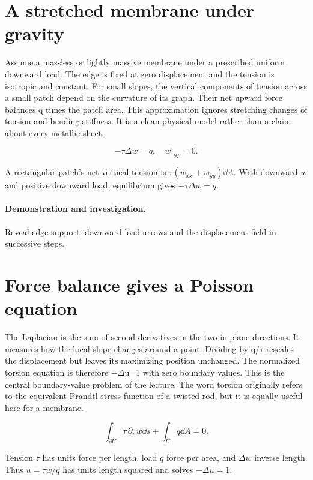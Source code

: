 \documentclass[11pt,oneside,openany]{book}
\begin{document}
\section{A stretched membrane under gravity}\label{sec:slide32}

Assume a massless or lightly massive membrane under a prescribed uniform downward load. The edge is fixed at zero displacement and the tension is isotropic and constant. For small slopes, the vertical components of tension across a small patch depend on the curvature of its graph. Their net upward force balances q times the patch area. This approximation ignores stretching changes of tension and bending stiffness. It is a clean physical model rather than a claim about every metallic sheet.


\[-\tau\Delta w=q,\quad w|_{\partial T}=0.\]


A rectangular patch's net vertical tension is
$\tau(w_{xx}+w_{yy})\dd A$. With downward $w$ and positive downward
load, equilibrium gives $-\tau\Delta w=q$.



\paragraph{Demonstration and investigation.} Reveal edge support, downward load arrows and the displacement field in successive steps.


\section{Force balance gives a Poisson equation}\label{sec:slide33}

The Laplacian is the sum of second derivatives in the two in-plane directions. It measures how the local slope changes around a point. Dividing by q/\ensuremath{\tau} rescales the displacement but leaves its maximizing position unchanged. The normalized torsion equation is therefore \ensuremath{-}\ensuremath{\Delta}u=1 with zero boundary values. This is the central boundary-value problem of the lecture. The word torsion originally refers to the equivalent Prandtl stress function of a twisted rod, but it is equally useful here for a membrane.


\[\int_{\partial U}\tau\,\partial_nw\dd s+\int_Uq\dd A=0.\]


Tension $\tau$ has units force per length, load $q$ force per area,
and $\Delta w$ inverse length. Thus $u=\tau w/q$ has units length
squared and solves $-\Delta u=1$.
\end{document}
